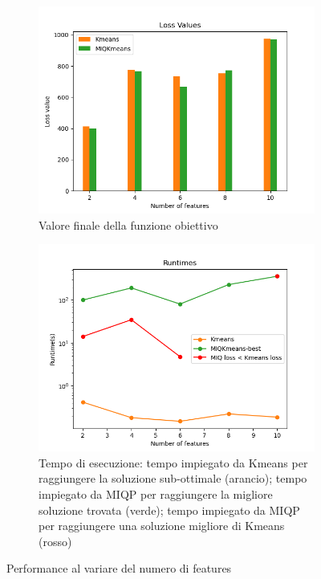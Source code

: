 \documentclass{article}
\begin{document}
    \begin{figure}[H]
     \centering
     \begin{subfigure}[t]{0.49\linewidth}
         \centering
         \includegraphics[width=\linewidth]{../results/log_plots/loss_features_sint}
         \caption{Valore finale della funzione obiettivo}
     \end{subfigure}
     \hfill
     \begin{subfigure}[t]{0.49\linewidth}
         \centering
         \includegraphics[width=\linewidth]{../results/log_plots/runtime_features_sint_log}
         \caption{Tempo di esecuzione: tempo impiegato da Kmeans per raggiungere la soluzione sub-ottimale (arancio); tempo impiegato da MIQP per raggiungere la migliore soluzione trovata (verde); tempo impiegato da MIQP per raggiungere una soluzione migliore di Kmeans (rosso)}
     \end{subfigure}
        \caption{Performance al variare del numero di features}
        \label{fig:f_sint}
     \end{figure}
\end{document}
